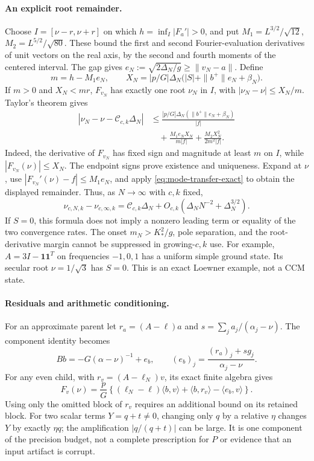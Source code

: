 \paragraph{An explicit root remainder.}
Choose $I=[\nu-r,\nu+r]$ on which
$h=\inf_I|F_a'|>0$, and put
$M_1=L^{3/2}/\sqrt{12}$, $M_2=L^{5/2}/\sqrt{80}$.
These bound the first and second Fourier-evaluation derivatives of unit
vectors on the real axis, by the second and fourth moments of the centered
interval. The gap gives
$e_N:=\sqrt{2\Delta_N/g}\ge\|v_N-a\|$. Define
\[
 m=h-M_1e_N,\qquad
 X_N=|p/G|\Delta_N\bigl(|S|+\|b^+\|e_N+\beta_N\bigr).
\]
If $m>0$ and $X_N<mr$, $F_{v_N}$ has exactly one root $\nu_N$ in $I$,
with $|\nu_N-\nu|\le X_N/m$. Taylor's theorem gives
\begin{align}
 |\nu_N-\nu-\mathcal C_{c,k}\Delta_N|
 &\le \frac{|p/G|\Delta_N(\|b^+\|e_N+\beta_N)}{|f|}
 \nonumber\\
 &\quad+\frac{M_1e_NX_N}{m|f|}
       +\frac{M_2X_N^2}{2m^2|f|}.
 \label{eq:mode-transfer-remainder}
\end{align}
Indeed, the derivative of $F_{v_N}$ has fixed sign and magnitude at least
$m$ on $I$, while $|F_{v_N}(\nu)|\le X_N$. The endpoint signs prove
existence and uniqueness. Expand at $\nu$, use
$|F_{v_N}'(\nu)-f|\le M_1e_N$, and apply
\eqref{eq:mode-transfer-exact} to obtain the displayed remainder.
Thus, as $N\to\infty$ with $c,k$ fixed,
\begin{equation}\label{eq:mode-transfer-law}
 \boxed{\nu_{c,N,k}-\nu_{c,\infty,k}
 =\mathcal C_{c,k}\Delta_N
  +O_{c,k}(\Delta_NN^{-2}+\Delta_N^{3/2}).}
\end{equation}
If $S=0$, this formula does not imply a nonzero leading term or equality
of the two convergence rates. The onset $m_N>K_*^2/g$, pole separation,
and the root-derivative margin cannot be suppressed in growing-$c,k$ use.
For example, $A=3I-\mathbf1\mathbf1^T$ on frequencies $-1,0,1$ has a
uniform simple ground state. Its secular root $\nu=1/\sqrt3$ has $S=0$.
This is an exact Loewner example, not a CCM state.

\paragraph{Residuals and arithmetic conditioning.}
For an approximate parent let $r_a=(A-\ell)a$ and
$s=\sum_j a_j/(\alpha_j-\nu)$. The component identity becomes
\[
 Bb=-G(\alpha-\nu)^{-1}+e_b,\qquad
 (e_b)_j=\frac{(r_a)_j+s g_j}{\alpha_j-\nu}.
\]
For any even child, with $r_v=(A-\ell_N)v$, its exact finite algebra gives
\[
 F_v(\nu)=\frac pG\left\{(\ell_N-\ell)\langle b,v\rangle
              +\langle b,r_v\rangle-\langle e_b,v\rangle\right\}.
\]
Using only the omitted block of $r_v$ requires an additional bound on its
retained block. For two scalar terms $Y=q+t\ne0$, changing only $q$ by a
relative $\eta$ changes $Y$ by exactly $\eta q$; the amplification
$|q/(q+t)|$ can be large. It is one component of the precision budget,
not a complete prescription for $P$ or evidence that an input artifact
is corrupt.

